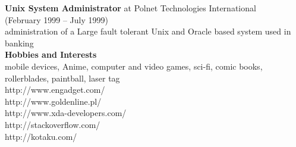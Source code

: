 \documentclass[9pt,a4paper,twocolumn]{extarticle}
\begin{document}
{\bf Unix System Administrator }
at Polnet Technologies International \\
(February 1999 – July 1999) \\
administration of a Large fault tolerant Unix and Oracle based system used in banking \\

{\bf\Large Hobbies and Interests}\\

mobile devices, Anime, computer and video games, sci-fi, comic books, rollerblades, paintball, laser tag\\

http://www.engadget.com/\\
http://www.goldenline.pl/\\
http://www.xda-developers.com/\\
http://stackoverflow.com/\\
http://kotaku.com/\\
\end{document}
